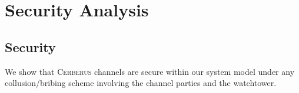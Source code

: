 \documentclass[runningheads]{llncs}
\newcommand{\sys}{\textsc{Cerberus}\xspace}
\begin{document}



\section{Security Analysis}

\subsection{Security}
We show that \sys channels are secure within our system model under any collusion/bribing scheme involving the channel parties and the watchtower.
\end{document}
